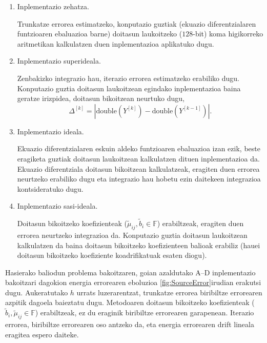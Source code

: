 \begin{enumerate}
\renewcommand{\theenumi}{\Alph{enumi}}

\item Inplementazio zehatza.

Trunkatze errorea estimatzeko, konputazio guztiak (ekuazio diferentzialaren funtzioaren ebaluazioa barne) doitasun laukoitzeko ($128$-bit) koma higikorreko aritmetikan kalkulatzen duen inplementazioa aplikatuko dugu. 


\item Inplementazio superideala.

Zenbakizko integrazio hau, iterazio errorea estimatzeko erabiliko dugu. Konputazio guztia doitasun laukoitzean egindako inplementazioa baina geratze irizpidea, doitasun bikoitzean neurtuko dugu,
\begin{equation*}
\Delta^{[k]}=|\text{double}(Y^{[k]})-\text{double}(Y^{[k-1]})|.
\end{equation*}

\item Inplementazio ideala.

Ekuazio diferentzialaren eskuin aldeko funtzioaren ebaluazioa izan ezik, beste eragiketa guztiak doitasun laukoitzean kalkulatzen dituen inplementazioa da. Ekuazio diferentziala doitasun bikoitzean kalkulatzeak, eragiten duen errorea neurtzeko erabiliko dugu eta integrazio hau hobetu ezin daitekeen integrazioa kontsideratuko dugu.  

\item Inplementazio sasi-ideala.

Doitasun bikoitzeko koefizienteak ($\tilde{\mu}_{ij},\tilde{b}_i \in \mathbb{F}$) erabiltzeak, eragiten duen errorea neurtzeko integrazioa da. Konputazio guztia doitasun laukoitzean kalkulatzen da baina doitasun bikoitzeko koefizienteen balioak erabiliz (hauei doitasun bikoitzeko koefiziente koadrifikatuak esaten diogu). 

\end{enumerate}


Hasierako baliodun problema bakoitzaren, goian azaldutako A--D inplementazio bakoitzari dagokion energia errorearen eboluzioa \ref{fig:SourceError}irudian erakutsi dugu. Aukeratutako $h$ urrats luzerarentzat, trunkatze errorea biribiltze errorearen azpitik dagoela baieztatu dugu. Metodoaren doitasun bikoitzeko koefizienteak ($\tilde{b}_i, \tilde{\mu}_{ij}\in \mathbb{F}$) erabiltzeak, ez du eraginik biribiltze errorearen garapenean.  Iterazio errorea, biribiltze errorearen oso antzeko da, eta energia errorearen drift lineala eragitea espero daiteke. 

